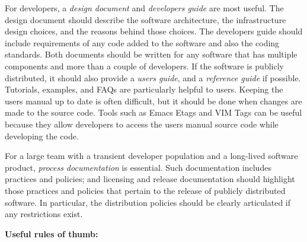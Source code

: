 \documentclass[]{article}
\begin{document}
For developers, a \emph{design document} and \emph{developers guide} are
most useful. The design document should describe the software
architecture, the infrastructure design choices, and the reasons behind
those choices. The developers guide should include requirements of any
code added to the software and also the coding standards. Both documents
should be written for any software that has multiple components and more
than a couple of developers. If the software is publicly distributed, it
should also provide a \emph{users guide}, and a \emph{reference guide}
if possible. Tutorials, examples, and FAQs are particularly helpful to
users. Keeping the users manual up to date is often difficult, but it
should be done when changes are made to the source code. Tools such as
Emacs Etags and VIM Tags can be useful because they allow developers to
access the users manual source code while developing the code.

For a large team with a transient developer population and a long-lived
software product, \emph{process documentation} is essential. Such
documentation includes practices and policies; and licensing and release
documentation should highlight those practices and policies that pertain
to the release of publicly distributed software. In particular, the
distribution policies should be clearly articulated if any restrictions
exist.

\textbf{Useful rules of thumb:}
\end{document}
